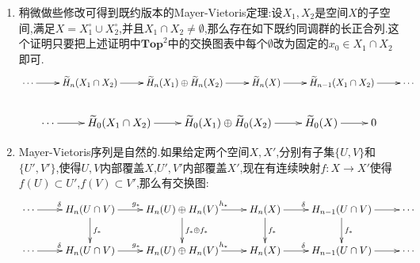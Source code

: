 \begin{enumerate}
\begin{proof}
		那么切除公理2保证了每第三个列映射$h_*$是同构,于是上一条说明这诱导结论中的长正合列.
	\end{proof}
    \item 稍微做些修改可得到既约版本的Mayer-Vietoris定理:设$X_1,X_2$是空间$X$的子空间,满足$X=X_1^{\circ}\cup X_2^{\circ}$,并且$X_1\cap X_2\not=\emptyset$,那么存在如下既约同调群的长正合列.这个证明只要把上述证明中$\textbf{Top}^2$中的交换图表中每个$\emptyset$改为固定的$x_0\in X_1\cap X_2$即可.$$\xymatrix{\cdots\ar[r]&\widetilde{H}_n(X_1\cap X_2)\ar[r]&\widetilde{H}_n(X_1)\oplus\widetilde{H}_n(X_2)\ar[r]&\widetilde{H}_n(X)\ar[r]&\widetilde{H}_{n-1}(X_1\cap X_2)\ar[r]&\cdots}$$
    $$\xymatrix{&&&}$$
    $$\xymatrix{\cdots\ar[r]&\widetilde{H}_0(X_1\cap X_2)\ar[r]&\widetilde{H}_0(X_1)\oplus\widetilde{H}_0(X_2)\ar[r]&\widetilde{H}_0(X)\ar[r]&0}$$
    \item Mayer-Vietoris序列是自然的.如果给定两个空间$X,X'$,分别有子集$\{U,V\}$和$\{U',V'\}$,使得$U,V$内部覆盖$X$,$U',V'$内部覆盖$X'$,现在有连续映射$f:X\to X'$使得$f(U)\subset U'$,$f(V)\subset V'$,那么有交换图:
    $$\xymatrix{\cdots\ar[r]^{\delta}&H_n(U\cap V)\ar[d]^{f_*}\ar[r]^{g_*}&H_n(U)\oplus H_n(V)\ar[d]^{f_*\oplus f_*}\ar[r]^{h_*}&H_n(X)\ar[d]^{f_*}\ar[r]^{\delta}&H_{n-1}(U\cap V)\ar[d]^{f_*}\ar[r]&\cdots\\\cdots\ar[r]^{\delta}&H_n(U\cap V)\ar[r]^{g_*}&H_n(U)\oplus H_n(V)\ar[r]^{h_*}&H_n(X)\ar[r]^{\delta}&H_{n-1}(U\cap V)\ar[r]&\cdots}$$
\end{enumerate}

